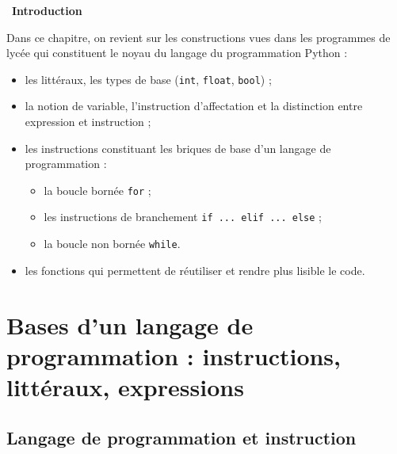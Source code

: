 \documentclass[a4paper, french, 12pt]{article}  %
\newenvironment{introduction}
{\par \medskip    \noindent  
 \begin {bclogo}[couleur = blue!5 , arrondi =0.1,logo=\bcrosevents, marge=4] {~\textbf{Introduction}    }
 \par }
{
\end{bclogo}
 \par \bigskip }
\newcounter{prog}
\begin{document}
\setlength{\parindent}{0cm}

\begin{introduction}{}
Dans ce chapitre, on revient sur les constructions vues dans les programmes de lycée qui constituent le noyau du langage du programmation  Python   :
\begin{itemize}

	\item les littéraux, les types de base (\texttt{int}, \texttt{float}, \texttt{bool}) ;
	\item la notion de variable, l'instruction d'affectation et la distinction entre expression et instruction ;
	\item les instructions constituant les briques de base d'un langage de programmation :
		\begin{itemize}
			\item la boucle bornée \texttt{for} ;
			 \item les instructions de branchement \texttt{if ... elif ... else} ;
			 \item la boucle non bornée \texttt{while}.
		\end{itemize}
   \item les fonctions qui permettent de réutiliser et  rendre plus lisible  le code.
\end{itemize}


\end{introduction}    

\vspace*{-20pt}


\section{Bases d'un langage de programmation : instructions, littéraux, expressions}

\subsection{Langage de programmation et instruction}
\end{document}

